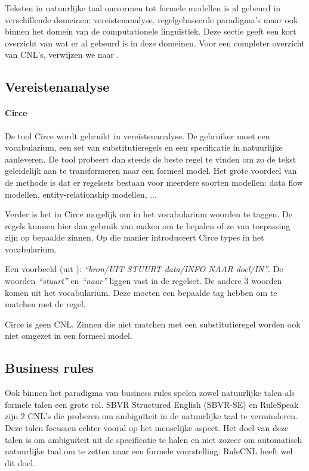 \documentclass[]{article}
\theoremstyle{definition}
\newcommand{\example}[1]{\textit{``#1''}}
\begin{document}
Teksten in natuurlijke taal omvormen tot formele modellen is al gebeurd in verschillende domeinen: vereistenanalyse, regelgebaseerde paradigma's maar ook binnen het domein van de computationele linguïstiek. Deze sectie geeft een kort overzicht van wat er al gebeurd is in deze domeinen. Voor een completer overzicht van CNL's, verwijzen we naar \cite{Kuhn2014}.

\subsection{Vereistenanalyse}
\paragraph{Circe} De tool Circe\cite{Ambriola1997} wordt gebruikt in vereistenanalyse. De gebruiker moet een vocabularium, een set van substitutieregels en een specificatie in natuurlijke aanleveren. De tool probeert dan steeds de beste regel te vinden om zo de tekst geleidelijk aan te transformeren naar een formeel model. Het grote voordeel van de methode is dat er regelsets bestaan voor meerdere soorten modellen: data flow modellen, entity-relationship modellen, ...

Verder is het in Circe mogelijk om in het vocabularium woorden te taggen. De regels kunnen hier dan gebruik van maken om te bepalen of ze van toepassing zijn op bepaalde zinnen. Op die manier introduceert Circe types in het vocabularium.

Een voorbeeld (uit \cite{Ambriola1997}): \example{bron/UIT STUURT data/INFO NAAR doel/IN}. De woorden \example{stuurt} en \example{naar} liggen vast in de regelset. De andere 3 woorden komen uit het vocabularium. Deze moeten een bepaalde tag hebben om te matchen met de regel.

Circe is geen CNL. Zinnen die niet matchen met een substitutieregel worden ook niet omgezet in een formeel model.

\subsection{Business rules}
Ook binnen het paradigma van business rules spelen zowel natuurlijke talen als formele talen een grote rol. SBVR Structured English (SBVR-SE)\cite{Levy2013} en RuleSpeak\cite{Ross2009a} zijn 2 CNL's die proberen om ambiguïteit in de natuurlijke taal te verminderen. Deze talen focussen echter vooral op het menselijke aspect. Het doel van deze talen is om ambiguïteit uit de specificatie te halen en niet zozeer om automatisch natuurlijke taal om te zetten naar een formele voorstelling. RuleCNL\cite{Njonko2014} heeft wel dit doel.
\end{document}
